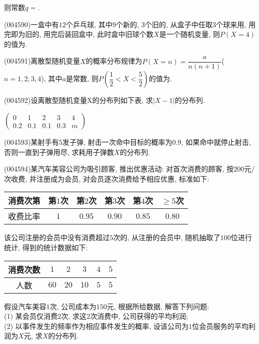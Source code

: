 则常数$q=$.
\item (004590)一盒中有$12$个乒乓球, 其中$9$个新的, $3$个旧的, 从盒子中任取$3$个球来用, 用完即为旧的, 用完后装回盒中, 此时盒中旧球个数$X$是一个随机变量, 则$P(X=4)$的值为.
\item (004591)离散型随机变量$X$的概率分布规律为$P(X=n)=\dfrac{a}{n(n+1)}$($n=1, 2, 3, 4$), 其中$a$是常数, 则$P(\dfrac 12<X<\dfrac 52)$的值为.
\item (004592)设离散型随机变量X的分布列如下表, 求$|X-1|$的分布列.
\begin{center}
    $\begin{pmatrix}
        0 & 1 & 2 & 3 & 4 \\ 
        0.2 & 0.1 & 0.1 & 0.3 & m 
    \end{pmatrix}$
\end{center}
\item (004593)某射手有$5$发子弹, 射击一次命中目标的概率为$0.9$, 如果命中就停止射击, 否则一直到子弹用尽, 求耗用子弹数$X$的分布列.
\item (004594)某汽车美容公司为吸引顾客, 推出优惠活动: 对首次消费的顾客, 按$200$元/次收费, 并注册成为会员, 对会员逐次消费给予相应优惠, 标准如下:\\
\begin{center}
    \begin{tabular}{|c|c|c|c|c|c|}
        \hline
        消费次第 & 第$1$次 & 第$2$次 & 第$3$次 & 第$4$次 & $\ge 5$次 \\ \hline
        收费比率 & $1$ & $0.95$ & $0.90$ & $0.85$ & $0.80$\\ \hline
    \end{tabular}
\end{center}
该公司注册的会员中没有消费超过$5$次的, 从注册的会员中, 随机抽取了$100$位进行统计, 得到的统计数据如下:
\begin{center}
    \begin{tabular}{|c|c|c|c|c|c|}
        \hline
        消费次数 & $1$ & $2$ & $3$ & $4$ & $5$ \\ \hline
        人数 & $60$ & $20$ & $10$ & $5$ & $5$\\ \hline
    \end{tabular}
\end{center}
假设汽车美容$1$次, 公司成本为$150$元, 根据所给数据, 解答下列问题:\\
(1) 某会员仅消费$2$次, 求这$2$次消费中, 公司获得的平均利润;\\
(2) 以事件发生的频率作为相应事件发生的概率, 设该公司为$1$位会员服务的平均利润为$X$元, 求$X$的分布列.
